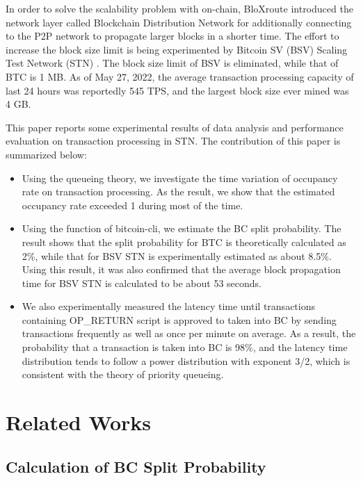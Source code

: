 \documentclass[graybox]{svmult}
\begin{document}
In order to solve the scalability problem with on-chain, 
BloXroute\cite{bloX} introduced the network layer called Blockchain Distribution Network for additionally connecting to the P2P network to propagate larger blocks in a shorter time. 
The effort to increase the block size limit is being experimented by Bitcoin SV (BSV) \cite{bsv} Scaling Test Network (STN) \cite{bitcoinscaling}.
The block size limit of BSV is eliminated, while that of BTC is 1 MB. 
As of May 27, 2022, the average transaction processing capacity of last 24 hours was reportedly 545 TPS, and the largest block size ever mined was 4 GB. 


This paper reports some experimental results of data analysis and performance evaluation on transaction processing in STN. 
The contribution of this paper is summarized below: 
%
\begin{itemize}
  \item Using the queueing theory, we investigate the time variation of occupancy rate on transaction processing. 
	As the result, we show that the estimated occupancy rate exceeded 1 during most of the time. 
  \item Using the function of bitcoin-cli, we estimate the BC split probability. 
	The result shows that the split probability for BTC is theoretically calculated as 2\%, while that for BSV STN is experimentally estimated as about 8.5\%.
	Using this result, it was also confirmed that the average block propagation time for BSV STN is calculated to be about 53 seconds. 
  \item We also experimentally measured the latency time until transactions containing OP\_RETURN script is approved to taken into BC by sending transactions frequently as well as once per minute on average. 
	As a result, the probability that a transaction is taken into BC is 98\%, and the latency time distribution tends to follow a power distribution with exponent 3/2, which is consistent with the theory of priority queueing. 
\end{itemize}
%




\section{Related Works}
\label{sec:rworks}

\subsection{Calculation of BC Split Probability}
\label{sec:fork}
\end{document}
